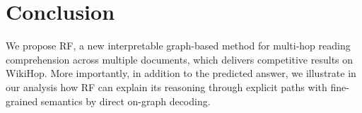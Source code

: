 
\section{Conclusion}
We propose RF, a new interpretable graph-based method for multi-hop reading comprehension across multiple documents, which delivers competitive results on WikiHop. More importantly, in addition to the predicted answer, we illustrate in our analysis how RF can explain its reasoning through explicit paths with fine-grained semantics by direct on-graph decoding.
